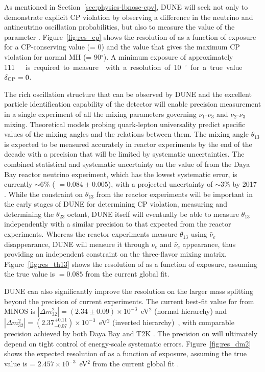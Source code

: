 As mentioned in Section~\ref{sec:physics-lbnosc-cpv}, DUNE will seek not only to demonstrate explicit CP violation by observing a difference in the neutrino and antineutrino oscillation probabilities, but also to measure the value of the parameter \deltacp. Figure~\ref{fig:res_cp} shows the resolution of \deltacp as a function of exposure for a CP-conserving value (\deltacp = 0) and the value
that gives the maximum CP violation for normal MH (\deltacp =
90\mbox{$^{\circ}$}).  A minimum exposure of approximately
\SI{111}~\ktMWyr{}  is required to measure \deltacp with a resolution of 10\mbox{$^{\circ}$} for
a true value $\delta_{\rm CP} = 0$.

The rich oscillation structure that can be observed by DUNE and the excellent particle identification capability of the detector will enable precision measurement  in a single experiment of all the mixing parameters governing $\nu_1$-$\nu_3$ and $\nu_2$-$\nu_3$ mixing. Theoretical models probing quark-lepton universality predict specific values of the mixing angles and the relations between them. The mixing angle $\theta_{13}$ is
expected to be measured accurately in reactor experiments by the end of the decade with a precision that will be limited by systematic uncertainties. 
The combined statistical and systematic uncertainty on the value of   from the Daya Bay reactor neutrino experiment, which has the lowest systematic error, is currently $\sim6$\% ( $= 0.084\pm0.005$),
with a projected uncertainty of $\sim$3\% by 2017~\cite{Zhang:2015fya} .
While the constraint on $\theta_{13}$ from the reactor experiments will be important in the
early stages of DUNE for determining CP violation, measuring
\deltacp and determining the $\theta_{23}$ octant, 
DUNE itself will eventually be able to measure
$\theta_{13}$ independently with a similar precision to that expected from the reactor experiments. 
Whereas the reactor experiments measure $\theta_{13}$ using $\bar{\nu}_e$ disappearance, DUNE will measure it through $\nu_e$ and $\bar{\nu}_e$ appearance, thus providing an independent constraint on
the three-flavor mixing matrix.   Figure~\ref{fig:res_th13} shows the resolution of  as a function of exposure, assuming the true value is $ = 0.085$ from the current global fit.

DUNE can also significantly improve the
resolution on the larger mass splitting beyond the precision of current experiments.  The current best-fit value for 
 from MINOS is $|\Delta m^2_{32}| = (2.34\pm0.09)\times10^{-3}$~eV$^2$ (normal hierarchy) and $|\Delta m^2_{32}| = (2.37^{+0.11}_{-0.07})\times10^{-3}$~eV$^2$ (inverted hierarchy)~\cite{Sousa:2015bxa}, with comparable precision achieved by both Daya Bay and T2K . The precision on  will ultimately depend on tight control of energy-scale systematic errors.  Figure~\ref{fig:res_dm2} shows the expected resolution of  as a function of exposure, assuming the true value is  = $2.457\times10^{-3}$~eV$^2$ from the current global fit .


